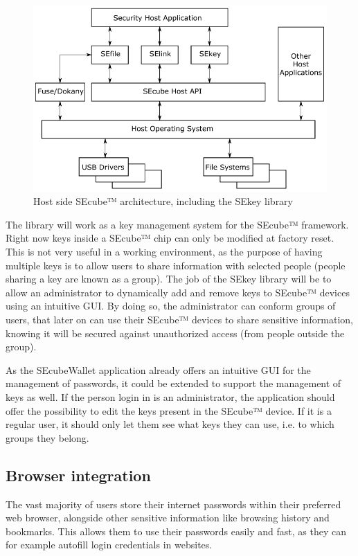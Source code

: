 \begin{figure}[htb]
  \centering
  \captionsetup{justification=centering}
  \centerline{\includegraphics[width=0.8\columnwidth]{chapters/figures/results/sekey.png}}
  \caption{Host side SEcube™ architecture, including the SEkey library}
  \label{fig:sekey}
\end{figure}

The library will work as a key management system for the SEcube™ framework. Right now keys inside a SEcube™ chip can only be modified at factory reset. This is not very useful in a working environment, as the purpose of having multiple keys is to allow users to share information with selected people (people sharing a key are known as a group). The job of the SEkey library will be to allow an administrator to dynamically add and remove keys to SEcube™ devices using an intuitive GUI. By doing so, the administrator can conform groups of users, that later on can use their SEcube™ devices to share sensitive information, knowing it will be secured against unauthorized access (from people outside the group).

As the SEcubeWallet application already offers an intuitive GUI for the management of passwords, it could be extended to support the management of keys as well. If the person login in is an administrator, the application should offer the possibility to edit the keys present in the SEcube™ device. If it is a regular user, it should only let them see what keys they can use, i.e. to which groups they belong.

\subsection{Browser integration} 

The vast majority of users store their internet passwords within their preferred web browser, alongside other sensitive information like browsing history and bookmarks. This allows them to use their passwords easily and fast, as they can for example autofill login credentials in websites.

